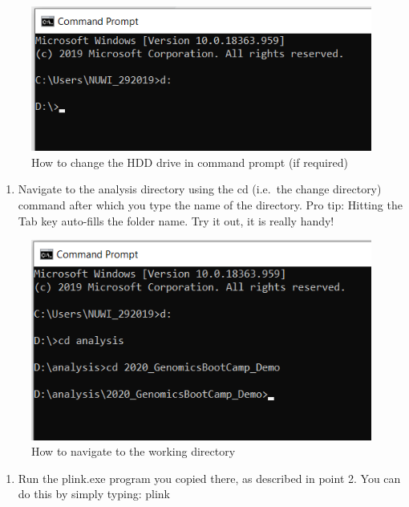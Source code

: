 \documentclass[]{book}
\providecommand{\tightlist}{%
  \setlength{\itemsep}{0pt}\setlength{\parskip}{0pt}}
\begin{document}
\begin{figure}
\includegraphics[width=7.15in]{images/4-2-cmdWindowPathChange} \caption{How to change the HDD drive in command prompt (if required)}\label{fig:fig4-2}
\end{figure}

\begin{enumerate}
\def\labelenumi{\alph{enumi})}
\setcounter{enumi}{2}
\tightlist
\item
  Navigate to the analysis directory using the cd (i.e.~the change
  directory) command after which you type the name of the directory. Pro
  tip: Hitting the Tab key auto-fills the folder name. Try it out, it is
  really handy!
\end{enumerate}

\begin{figure}
\includegraphics[width=7.08in]{images/4-3-cmdWindowPathChange2} \caption{How to navigate to the working directory}\label{fig:fig4-3}
\end{figure}

\begin{enumerate}
\def\labelenumi{\alph{enumi})}
\setcounter{enumi}{3}
\tightlist
\item
  Run the plink.exe program you copied there, as described in point 2.
  You can do this by simply typing: plink
\end{enumerate}
\end{document}
